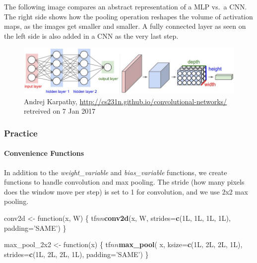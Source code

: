 \documentclass[]{article}
\newenvironment{Shaded}{\begin{snugshade}}{\end{snugshade}}
\newcommand{\KeywordTok}[1]{\textcolor[rgb]{0.13,0.29,0.53}{\textbf{{#1}}}}
\newcommand{\DataTypeTok}[1]{\textcolor[rgb]{0.13,0.29,0.53}{{#1}}}
\newcommand{\StringTok}[1]{\textcolor[rgb]{0.31,0.60,0.02}{{#1}}}
\newcommand{\NormalTok}[1]{{#1}}
\let\oldparagraph\paragraph
\renewcommand{\paragraph}[1]{\oldparagraph{#1}\mbox{}}
\begin{document}
The following image compares an abstract representation of a MLP vs.~a
CNN. The right side shows how the pooling operation reshapes the volume
of activation maps, as the images get smaller and smaller. A fully
connected layer as seen on the left side is also added in a CNN as the
very last step.

\begin{figure}
\centering
\includegraphics{figures/mlp_vs_cnn.png}
\caption{Andrej Karpathy,
\url{http://cs231n.github.io/convolutional-networks/} retreived on 7 Jan
2017}
\end{figure}

\subsubsection{Practice}\label{practice}

\paragraph{Convenience Functions}\label{convenience-functions}

In addition to the \emph{weight\_variable} and \emph{bias\_variable}
functions, we create functions to handle convolution and max pooling.
The stride (how many pixels does the window move per step) is set to 1
for convolution, and we use 2x2 max pooling.

\begin{Shaded}
\begin{Highlighting}[]
\NormalTok{conv2d <-}\StringTok{ }\NormalTok{function(x, W) \{}
  \NormalTok{tf$nn$}\KeywordTok{conv2d}\NormalTok{(x, W, }\DataTypeTok{strides=}\KeywordTok{c}\NormalTok{(1L, 1L, 1L, 1L), }\DataTypeTok{padding=}\StringTok{'SAME'}\NormalTok{)}
\NormalTok{\}}

\NormalTok{max_pool_2x2 <-}\StringTok{ }\NormalTok{function(x) \{}
  \NormalTok{tf$nn$}\KeywordTok{max_pool}\NormalTok{(}
    \NormalTok{x,}
    \DataTypeTok{ksize=}\KeywordTok{c}\NormalTok{(1L, 2L, 2L, 1L),}
    \DataTypeTok{strides=}\KeywordTok{c}\NormalTok{(1L, 2L, 2L, 1L),}
    \DataTypeTok{padding=}\StringTok{'SAME'}\NormalTok{)}
\NormalTok{\}}
\end{Highlighting}
\end{Shaded}
\end{document}
